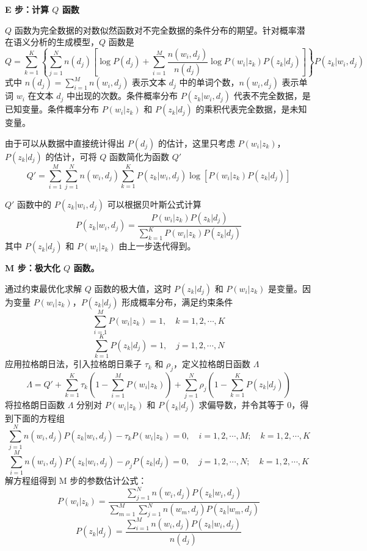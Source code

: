 \documentclass[UTF8, 12pt, fontset=fandol, oneside]{ctexart}
\begin{document}
\noindent\textbf{E 步：计算 $Q$ 函数}

$Q$ 函数为完全数据的对数似然函数对不完全数据的条件分布的期望。针对概率潜在语义分析的生成模型，$Q$ 函数是
\begin{equation}
Q=\sum_{k=1}^{K}\left\{\sum_{j=1}^{N}n(d_j)\left[\log P(d_j)+\sum_{i=1}^{M}\frac{n(w_i,d_j)}{n(d_j)}\log P(w_i|z_k)P(z_k|d_j)\right]\right\}P(z_k|w_i,d_j)
\tag{18.9}
\end{equation}
式中 $n(d_j)=\sum_{i=1}^{M}n(w_i,d_j)$ 表示文本 $d_j$ 中的单词个数，$n(w_i,d_j)$ 表示单词 $w_i$ 在文本 $d_j$ 中出现的次数。条件概率分布 $P(z_k|w_i,d_j)$ 代表不完全数据，是已知变量。条件概率分布 $P(w_i|z_k)$ 和 $P(z_k|d_j)$ 的乘积代表完全数据，是未知变量。

由于可以从数据中直接统计得出 $P(d_j)$ 的估计，这里只考虑 $P(w_i|z_k)$，$P(z_k|d_j)$ 的估计，可将 $Q$ 函数简化为函数 $Q'$
\begin{equation}
Q'=\sum_{i=1}^{M}\sum_{j=1}^{N}n(w_i,d_j)\sum_{k=1}^{K}P(z_k|w_i,d_j)\log[P(w_i|z_k)P(z_k|d_j)]
\tag{18.10}
\end{equation}

$Q'$ 函数中的 $P(z_k|w_i,d_j)$ 可以根据贝叶斯公式计算
\begin{equation}
P(z_k|w_i,d_j)=
\frac{P(w_i|z_k)P(z_k|d_j)}
{\displaystyle\sum_{k=1}^{K}P(w_i|z_k)P(z_k|d_j)}
\tag{18.11}
\end{equation}
其中 $P(z_k|d_j)$ 和 $P(w_i|z_k)$ 由上一步迭代得到。

\noindent\textbf{M 步：极大化 $Q$ 函数。}

通过约束最优化求解 $Q$ 函数的极大值，这时 $P(z_k|d_j)$ 和 $P(w_i|z_k)$ 是变量。因为变量 $P(w_i|z_k)$，$P(z_k|d_j)$ 形成概率分布，满足约束条件
\[
\sum_{i=1}^{M}P(w_i|z_k)=1,\quad k=1,2,\cdots,K
\]
\[
\sum_{k=1}^{K}P(z_k|d_j)=1,\quad j=1,2,\cdots,N
\]
应用拉格朗日法，引入拉格朗日乘子 $\tau_k$ 和 $\rho_j$，定义拉格朗日函数 $\Lambda$
\[
\Lambda=Q'+\sum_{k=1}^{K}\tau_k\left(1-\sum_{i=1}^{M}P(w_i|z_k)\right)+\sum_{j=1}^{N}\rho_j\left(1-\sum_{k=1}^{K}P(z_k|d_j)\right)
\]
将拉格朗日函数 $\Lambda$ 分别对 $P(w_i|z_k)$ 和 $P(z_k|d_j)$ 求偏导数，并令其等于 0，得到下面的方程组
\[
\sum_{j=1}^{N}n(w_i,d_j)P(z_k|w_i,d_j)-\tau_k P(w_i|z_k)=0,\quad i=1,2,\cdots,M;\quad k=1,2,\cdots,K
\]
\[
\sum_{i=1}^{M}n(w_i,d_j)P(z_k|w_i,d_j)-\rho_j P(z_k|d_j)=0,\quad j=1,2,\cdots,N;\quad k=1,2,\cdots,K
\]
解方程组得到 M 步的参数估计公式：
\begin{equation}
P(w_i|z_k)=
\frac{\displaystyle\sum_{j=1}^{N}n(w_i,d_j)P(z_k|w_i,d_j)}
{\displaystyle\sum_{m=1}^{M}\sum_{j=1}^{N}n(w_m,d_j)P(z_k|w_m,d_j)}
\tag{18.12}
\end{equation}
\begin{equation}
P(z_k|d_j)=
\frac{\displaystyle\sum_{i=1}^{M}n(w_i,d_j)P(z_k|w_i,d_j)}
{n(d_j)}
\tag{18.13}
\end{equation}
\end{document}
